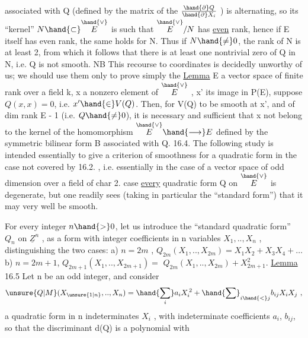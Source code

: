 
associated with Q (defined by the matrix of the $\frac{\hand{\partial} Q}{\hand{\partial} X_i}$ ) is alternating, so its
``kernel'' $N\hand{\subset}\overset{\hand{\vee}}{E}$ is such that $\overset{\hand{\vee}}{E}/N$ has \uline{even} rank, hence if E itself
has even rank, the same holds for N. Thus if $N\hand{\neq} 0$, the rank of N
is at least 2, from which it follows that there is at least one nontrivial zero of
Q in N, i.e. Q is not smooth. NB This recourse to coordinates is decidedly
unworthy of us; we should use them only to prove
simply the
\uline{Lemma}  E a vector space of finite rank over a field k,  x a nonzero element of
$\overset{\hand{\vee}}{E}$ ,  x' its image in P(E), suppose $Q(x,x) = 0$, i.e.
$x'\hand{\in} V(Q)$. Then, for  V(Q) to be smooth at x',
and of  dim rank E - 1 (i.e. $Q\hand{\neq} 0$), it is necessary and sufficient that x not
belong to the kernel of the homomorphism $\overset{\hand{\vee}}{E}\hand{\longrightarrow} E$ defined by the symmetric bilinear
form B associated with Q\hand{/}.
16.4. The following study is intended essentially to 
give a criterion of smoothness for a quadratic form in the case not
covered by 16.2. , i.e. essentially in the case of a vector space of
odd dimension over a field of char 2.  case \uline{every} quadratic
form Q on $\overset{\hand{\vee}}{E}$ is degenerate, but one readily sees (taking in particular
the ``standard form'') that it may very well be smooth.

For every integer $n\hand{>}0$, let us introduce the ``standard quadratic form''
$Q_n$ on $\underline{Z}^n$ , as a form with integer coefficients in n variables
$X_1,..,X_n$ , distinguishing the two cases:
a) $n = 2m$ , $Q_{2m}(X_1,..,X_{2m}) = X_1X_2 + X_3X_4 + \ldots$
b) $n = 2m+1$, $Q_{2m+1}(X_1,..,X_{2m+1}) =$ $Q_{2m}(X_1,..,X_{2m}) + X_{2m+1}^2$.
\uline{Lemma} 16.5 Let n be an odd integer, and consider
\[ \unsure{Q|M}(X_{\unsure{1|n}},..,X_n) = \hand{\sum_i} a_iX_i^{\,2} + \hand{\sum}_{i\hand{<}j} b_{ij}X_iX_j \ , \]
a quadratic form in n indeterminates $X_i$ , with indeterminate coefficients
$a_i$, $b_{ij}$, so that the discriminant d(Q) is a polynomial with

